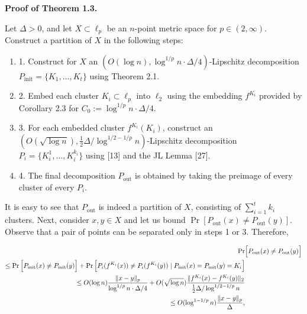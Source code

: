 \documentclass[10pt,a4paper]{amsart}
\begin{document}
\par\medskip\noindent\textbf{Proof of Theorem 1.3.}\par
Let $\Delta>0$, and let $X\subset\ell_{p}$ be an $n$-point metric space for $p\in(2,\infty)$. Construct a partition of $X$ in the following steps:
\par
\begin{enumerate}
\item  1. 
Construct for $X$ an $(O(\log{n}),\log^{1/p}{n}\cdot\Delta/4)$-Lipschitz decomposition $P_{\text{init}}=\{K_{1},\ldots,K_{t}\}$ using Theorem 2.1.
\par
\par
\item  2. 
Embed each cluster $K_{i}\subset\ell_{p}$ into $\ell_{2}$ using the embedding $f^{K_{i}}$ provided by Corollary 2.3 for $C_{0}:=\log^{1/p}{n}\cdot\Delta/4$.
\par
\par
\item  3. 
For each embedded cluster $f^{K_{i}}(K_{i})$, construct an $(O(\sqrt{\log{n}}),\frac{1}{2}\Delta/\log^{1/2-1/p}n)$-Lipschitz decomposition $P_{i}=\{K_{i}^{1},\ldots,K_{i}^{k_{i}}\}$ using [13] and the JL Lemma [27].
\par
\par
\item  4. 
The final decomposition $P_{\text{out}}$ is obtained by taking the preimage of every cluster of every $P_{i}$.
\par
\par
\end{enumerate}
\par
It is easy to see that $P_{\text{out}}$ is indeed a partition of $X$, consisting of $\sum_{i=1}^{t}k_{i}$ clusters. Next, consider $x,y\in X$ and let us bound $\Pr[P_{\text{out}}(x)\neq P_{\text{out}}(y)]$. Observe that a pair of points can be separated only in steps 1 or 3. Therefore,
\par
\[\begin{aligned}
\displaystyle\Pr & \displaystyle\Big{[}P_{\text{out}}(x)\neq P_{\text{out}}(y)\Big{]} \\
\displaystyle\leq\Pr\Big{[}P_{\text{init}}(x)\neq P_{\text{init}}(y)\Big{]}+%
\Pr\Big{[}P_{i}(f^{K_{i}}(x))\neq P_{i}(f^{K_{i}}(y))\mid P_{\text{init}}(x)=P%
_{\text{init}}(y)=K_{i}\Big{]} \\
\displaystyle\leq O(\log{n})\frac{\|x-y\|_{p}}{\log^{1/p}{n}\cdot\Delta/4}+O(%
\sqrt{\log{n}})\frac{\|f^{K_{i}}(x)-f^{K_{i}}(y)\|_{2}}{\frac{1}{2}\Delta/\log%
^{1/2-1/p}n} \\
\displaystyle\leq O(\log^{1-1/p}{n})\frac{\|x-y\|_{p}}{\Delta},
\end{aligned}\]
\end{document}
